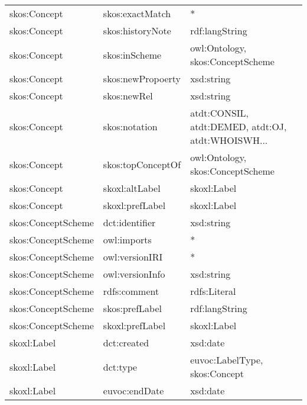 \documentclass[10pt,a4paper,titlepage,final]{article}
\begin{document}
\begin{longtable}{lll}
        skos:Concept &         skos:exactMatch &                                                  * \\
        skos:Concept &        skos:historyNote &                                     rdf:langString \\
        skos:Concept &           skos:inScheme &                   owl:Ontology, skos:ConceptScheme \\
        skos:Concept &       skos:newPropoerty &                                         xsd:string \\
        skos:Concept &             skos:newRel &                                         xsd:string \\
        skos:Concept &           skos:notation &  atdt:CONSIL, atdt:DEMED, atdt:OJ, atdt:WHOISWH... \\
        skos:Concept &       skos:topConceptOf &                   owl:Ontology, skos:ConceptScheme \\
        skos:Concept &          skoxl:altLabel &                                        skoxl:Label \\
        skos:Concept &         skoxl:prefLabel &                                        skoxl:Label \\
  skos:ConceptScheme &          dct:identifier &                                         xsd:string \\
  skos:ConceptScheme &             owl:imports &                                                  * \\
  skos:ConceptScheme &          owl:versionIRI &                                                  * \\
  skos:ConceptScheme &         owl:versionInfo &                                         xsd:string \\
  skos:ConceptScheme &            rdfs:comment &                                       rdfs:Literal \\
  skos:ConceptScheme &          skos:prefLabel &                                     rdf:langString \\
  skos:ConceptScheme &         skoxl:prefLabel &                                        skoxl:Label \\
         skoxl:Label &             dct:created &                                           xsd:date \\
         skoxl:Label &                dct:type &                      euvoc:LabelType, skos:Concept \\
         skoxl:Label &           euvoc:endDate &                                           xsd:date \\

\end{longtable}
\end{document}
